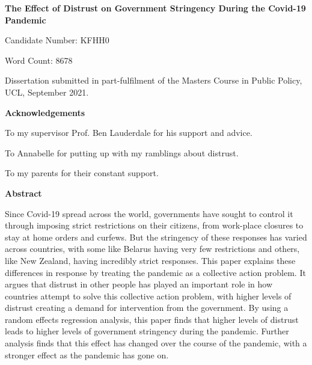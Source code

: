 \documentclass[
  12pt,
]{article}
\author{}
\date{\vspace{-2.5em}}
\begin{document}
\begin{titlepage}
\begin{center}
\vspace*{5cm}
\LARGE
\textbf{The Effect of Distrust on Government Stringency During the Covid-19 Pandemic}


\vspace{1.5cm}
\large
Candidate Number: KFHH0

\vspace{0.5cm}
Word Count: 8678

\vfill

Dissertation submitted in part-fulfilment of the Masters Course in Public Policy, UCL,  September 2021.

\end{center}
\end{titlepage}

\begin{center}
\textbf{Acknowledgements}

To my supervisor Prof. Ben Lauderdale for his support and advice.

To Annabelle for putting up with my ramblings about distrust.

To my parents for their constant support.
\end{center}

\pagebreak

\begin{center}
\vspace*{5cm}
\textbf{Abstract}
\end{center}
Since Covid-19 spread across the world, governments have sought to control it through imposing strict restrictions on their citizens, from work-place closures to stay at home orders and curfews. But the stringency of these responses has varied across countries, with some like Belarus having very few restrictions and others, like New Zealand, having incredibly strict responses. This paper explains these differences in response by treating the pandemic as a collective action problem. It argues that distrust in other people has played an important role in how countries attempt to solve this collective action problem, with higher levels of distrust creating a demand for intervention from the government. By using a random effects regression analysis, this paper finds that higher levels of distrust leads to higher levels of government stringency during the pandemic. Further analysis finds that this effect has changed over the course of the pandemic, with a stronger effect as the pandemic has gone on.
\pagebreak
\end{document}
